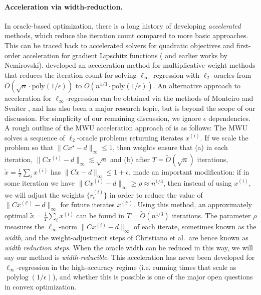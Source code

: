 \documentclass[11pt]{article}
\newcommand\dd{\boldsymbol{\mathit{d}}}
\newcommand\xx{\boldsymbol{\mathit{x}}}
\newcommand\xxtil{\widetilde{\boldsymbol{\mathit{x}}}}
\newcommand\CC{\boldsymbol{\mathit{C}}}
\newcommand\Otil{\widetilde{O}}
\begin{document}
\paragraph{Acceleration via width-reduction.}
In oracle-based optimization, there is a long history of developing \emph{accelerated} methods, which reduce the iteration count compared to more basic approaches.
This can be traced back to accelerated solvers for quadratic objectives \cite{L52,HS52} and first-order acceleration for gradient Lipschitz functions (\cite{N83} and earlier works by Nemirovski).
\textcite{christiano2011electrical} developed an acceleration method for multiplicative weight methods that reduces the iteration count for solving $\ell_\infty$ regression with $\ell_2$-oracles from $\Otil(\sqrt{n} \cdot \text{poly} (1/\epsilon))$ to $\Otil(n^{1/3} \cdot \text{poly} (1/\epsilon))$.
An alternative approach to acceleration for $\ell_\infty$-regression can be obtained via the methods of Monteiro and Svaiter \cite{MS13}, and has also been a major research topic, but is beyond the scope of our discussion.
For simplicity of our remaining discussion, we ignore $\epsilon$ dependencies.
A rough outline of the MWU acceleration approach of \textcite{christiano2011electrical} is as follows:
The MWU solves a sequence of $\ell_2$-oracle problems returning iterates 
$\xx^{(i)}$.
If we scale the problem so that $\|\CC\xx^{\star}-\dd\|_{\infty} \leq 1$,
then weights ensure that (a) in each iteration, 
$\|\CC\xx^{(i)}-\dd\|_{\infty} \lesssim \sqrt{n}$
and (b) after $T = \Otil(\sqrt{n})$ iterations, $\xxtil = \frac{1}{T}\sum_i \xx^{(i)}$ has $\|\CC\xxtil-\dd\|_{\infty}\leq 1+\epsilon$.
\cite{christiano2011electrical} made an important modification: if in some iteration we have $\|\CC\xx^{(i)}-\dd\|_{\infty}\geq \rho \approx n^{1/3}$, then instead of using $\xx^{(i)}$, we will adjust the weights $\{r_e^{(i)}\}$ in order to reduce the value of  $\|\CC\xx^{(i')}-\dd\|_{\infty}$ for future iterates $\xx^{(i')}$.
Using this method, an approximately optimal $\xxtil = \frac{1}{T}\sum_i \xx^{(i)}$ can be found in $T = \Otil(n^{1/3})$ iterations.
The parameter $\rho$ measures the $\ell_\infty$-norm $\|\CC\xx^{(i)}-\dd\|_{\infty}$ of each iterate, sometimes known as the \emph{width}, and the weight-adjustment steps of Christiano et al.~are hence known as \emph{width reduction steps}.
When the oracle width can be reduced in this way, we will say our method is \emph{width-reducible}.
This acceleration has never been developed for $\ell_{\infty}$-regression in the high-accuracy regime (i.e. running times that scale as $\operatorname{polylog}(1/\epsilon)$), and whether this is possible is one of the major open questions in convex optimization.
\end{document}
